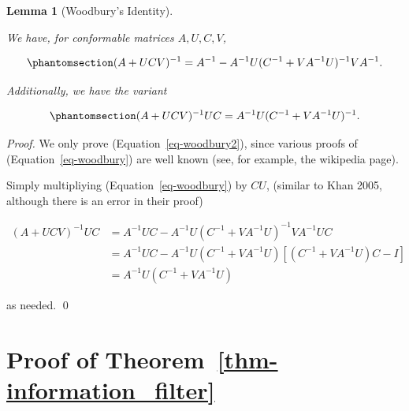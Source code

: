 \documentclass[
]{report}
\theoremstyle{plain}
\theoremstyle{plain}
\newtheorem{lemma}{Lemma}[section]
\theoremstyle{plain}
\theoremstyle{remark}
\begin{document}
\begin{lemma}[Woodbury's
Identity]\protect\hypertarget{lem-woodbury}{}\label{lem-woodbury}

We have, for conformable matrices \(A, U, C, V\),

\begin{equation}\phantomsection\label{eq-woodbury}{\begin{split}
(A + UCV)^{-1} = A^{-1} - A^{-1} U (C^{-1} + VA^{-1}U)^{-1}VA^{-1}.
\end{split}
}\end{equation}

Additionally, we have the variant

\begin{equation}\phantomsection\label{eq-woodbury2}{\begin{split}
(A + UCV)^{-1}UC = A^{-1} U(C^{-1} + VA^{-1}U)^{-1}.
\end{split}
}\end{equation}

\end{lemma}

\begin{proof}
We only prove (Equation~\ref{eq-woodbury2}), since various proofs of
(Equation~\ref{eq-woodbury}) are well known (see, for example, the
wikipedia page).

Simply multipliying (Equation~\ref{eq-woodbury}) by \(CU\), (similar to
Khan 2005, although there is an error in their proof)

\[\begin{split}
(A+UCV)^{-1}UC &= A^{-1}UC - A^{-1}U(C^{-1} + VA^{-1}U)^{-1}VA^{-1}UC\\
&= A^{-1}UC - A^{-1}U(C^{-1} + VA^{-1}U) [(C^{-1} +VA^{-1}U)C - I]\\
&= A^{-1}U(C^{-1}+VA^{-1}U)
\end{split}
\]

as needed. \qed
\end{proof}

\section{\texorpdfstring{Proof of
Theorem~\ref{thm-information_filter}}{Proof of Theorem~}}\label{sec-app1}
\end{document}
